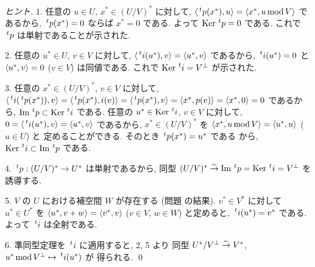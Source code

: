 \documentclass[12pt,twoside]{jarticle}
\begin{document}
\begin{proof}[ヒント]
  1. 任意の $u\in U$, $x^*\in (U/V)^*$ に対して, %
  $\bra\tp{p}(x^*),u\ket = \bra x^*,u\MOD V\ket$ であるから, %
  $\tp{p}(x^*)=0$ ならば $x^*=0$ である.
  よって $\Ker\tp{p}=0$ である.
  これで $\tp{p}$ は単射であることが示された.

  2. 任意の $u^*\in U$, $v\in V$ に対して, %
  $\bra \tp{i}(u^*),v\ket = \bra u^*,v\ket$ であるから, %
  $\tp{i}(u^*)=0$ と $\langle u^*,v\rangle=0$ ($v\in V$) は同値である.
  これで $\Ker\tp{i}=V^\bot$ が示された.

  3. 任意の $x^*\in(U/V)^*$, $v\in V$ に対して, %
  $\bra\tp{i}(\tp{p}(x^*)),v\ket 
  = \bra\tp{p}(x^*),i(v)\ket
  = \bra\tp{p}(x^*),v\ket
  = \bra x^*,p(v)\ket 
  = \bra x^*,0\ket 
  = 0$ であるから, $\Image\tp{p}\subset\Ker\tp{i}$ である.
  任意の $u^*\in\Ker\tp{i}$, $v\in V$ に対して, %
  $0 = \bra\tp{i}(u^*),v\ket
  = \bra u^*,v\ket$ であるから, $x^*\in(U/V)^*$ を %
  $\langle x^*,u\mathop{\mathrm{mod}}\nolimits V\rangle = \langle u^*,u\rangle$ ($u\in U$) と
  定めることができる. そのとき $\tp{p}(x^*)=u^*$ である
  から, $\Ker\tp{i}\subset\Image\tp{p}$ である.

  4. $\tp{p}:(U/V)^*\to U^*$ は単射であるから, 
  同型 $(U/V)^*\isomto\Image\tp{p}=\Ker\tp{i}=V^\bot$ を誘導する.

  5. $V$ の $U$ における補空間 $W$ が存在する
  (問題  の結果).
  $v^*\in V^*$ に対して $u^*\in U^*$ を $\langle u^*,v+w\rangle=\langle v^*,v\rangle$
  ($v\in V$, $w\in W$) と定めると, $\tp{i}(u^*)=v^*$ である.
  よって $\tp{i}$ は全射である.

  6. 準同型定理を $\tp{i}$ に適用すると, 2, 5 より
  同型 $U^*/V^\bot\overset\sim\rightarrow V^*$, $u^*\MOD V^\bot \mapsto \tp{i}(u^*)$ が
  得られる.
  \qed
\end{proof}

\end{document}
